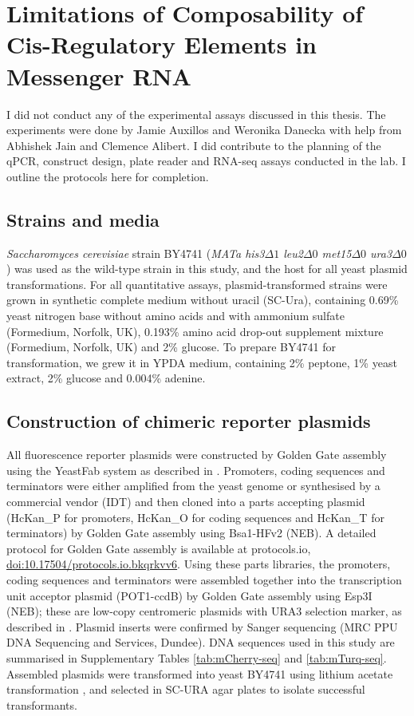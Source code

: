 \documentclass[../main.tex]{subfiles}
\begin{document}
\section{{Limitations} of Composability of Cis-Regulatory Elements in Messenger RNA}

I did not conduct any of the experimental assays discussed in this thesis. The experiments were done by Jamie Auxillos and Weronika Danecka with help from Abhishek Jain and Clemence Alibert. I did contribute to the planning of the qPCR, construct design, plate reader and RNA-seq assays conducted in the lab. I outline the protocols here for completion.

\subsection{Strains and media}

\emph{Saccharomyces cerevisiae} strain BY4741 (\emph{MATa his3\(\Delta1\) leu2\(\Delta0\) met15\(\Delta0\) ura3\(\Delta0\)}) was used as the wild-type strain in this study, and the host for all yeast plasmid transformations.
For all quantitative assays, plasmid-transformed strains were grown in synthetic complete medium without uracil (SC-Ura), containing 0.69\% yeast nitrogen base without amino acids and with ammonium sulfate (Formedium, Norfolk, UK), 0.193\% amino acid drop-out supplement mixture (Formedium, Norfolk, UK) and 2\% glucose.
To prepare BY4741 for transformation, we grew it in YPDA medium, containing 2\% peptone, 1\% yeast extract, 2\% glucose and 0.004\% adenine.

\subsection{Construction of chimeric reporter plasmids}

All fluorescence reporter plasmids were constructed by Golden Gate assembly using the YeastFab system as described in \parencite{Garcia2018}.
Promoters, coding sequences and terminators were either amplified from the yeast genome or synthesised by a commercial vendor (IDT) and then cloned into a parts accepting plasmid (HcKan\_P for promoters, HcKan\_O for coding sequences and HcKan\_T for terminators) by Golden Gate assembly using Bsa1-HFv2 (NEB).
A detailed protocol for Golden Gate assembly is available at protocols.io, \href{http://dx.doi.org/10.17504/protocols.io.bkqrkvv6}{doi:10.17504/protocols.io.bkqrkvv6}.
Using these parts libraries, the promoters, coding sequences and terminators were assembled together into the transcription unit acceptor plasmid (POT1-ccdB) by Golden Gate assembly using Esp3I (NEB); these are low-copy centromeric plasmids with URA3 selection marker, as described in \parencite{Garcia2018}.
Plasmid inserts were confirmed by Sanger sequencing (MRC PPU DNA Sequencing and Services, Dundee).
DNA sequences used in this study are summarised in Supplementary Tables \ref{tab:mCherry-seq} and \ref{tab:mTurq-seq}.
Assembled plasmids were transformed into yeast BY4741 using lithium acetate transformation \parencite{Gietz2002a}, and selected in SC-URA agar plates to isolate successful transformants.
\end{document}

